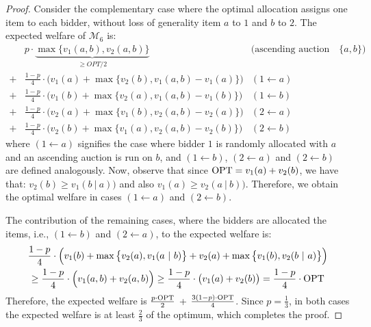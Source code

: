 \begin{proof}
Consider the complementary case where the optimal allocation assigns one item to each bidder, without loss of generality 
item $a$ to  $1$ and  $b$ to $2$. 
The expected welfare of $\mathcal M_6$ is:
\begin{align*}
    &p\cdot \underbrace{\max\{v_1(a,b),v_2(a,b)\}}_{\ge OPT/2} \quad&\text{(ascending auction on $\{a,b\}$)} &\\
    +&\frac{1-p}{4}\cdot\Big(v_1(a)+\max\big\{v_2(b),v_1(a,b)-v_1(a)\big\}\Big) &(1\gets a) \\ 
    +&\frac{1-p}{4}\cdot\Big(v_1(b)+
    \max\big\{v_2(a),v_1(a,b)-v_1(b)\big\} \Big) &(1\gets b) \\
    +&\frac{1-p}{4}\cdot\Big(v_2(a)+
    \max\big\{v_1(b),v_2(a,b)-v_2(a)\big\} \Big) &(2\gets a) \\
    +&\frac{1-p}{4}\cdot\Big(v_2(b)+
    \max\big\{v_1(a),v_2(a,b)-v_2(b)\big\} \Big) &(2\gets b)
\end{align*}
where $(1\gets a)$ signifies the case where bidder $1$ is randomly allocated with $a$ and an ascending auction is run on $b$, and $(1\gets b)$, $(2\gets a)$ and $(2\gets b)$ are defined analogously. 
Now, observe that since $\text{OPT}=v_1(a)+v_2(b)$, we have that: 
 $v_2(b)\ge v_1(b~|~a))$ and also $v_1(a)\ge v_2(a~|~b))$. Therefore, we obtain the optimal welfare in cases $(1\gets a)$ and $(2\gets b)$.  

 The contribution of the remaining cases,
where the bidders are allocated the  items, i.e., $(1\gets b)$ and $(2\gets a)$, to the expected welfare is: 
 \begin{multline*}
     \frac{1-p}{4}\cdot\Big(v_1(b)+
    \max\big\{v_2(a),v_1(a~|~b)\big\}+ v_2(a)+
    \max\big\{v_1(b),v_2(b~|~a)\big\}\Big)   \\  
    \ge \frac{1-p}{4}\cdot\Big( v_1(a,b)+v_2(a,b)  \Big) \ge \frac{1-p}{4}\cdot\big(v_1(a)+v_2(b)\big)=\frac{1-p}{4}\cdot \text{OPT}
 \end{multline*}
Therefore, the expected welfare is $\frac{p\cdot \text{OPT}}{2}$ + $\frac{3(1-p)\cdot \text{OPT}}{4}$.  
Since $p=\frac{1}{3}$, in both cases the expected welfare is at least $\frac{2}{3}$ of the optimum, which completes the proof. 
\end{proof}
